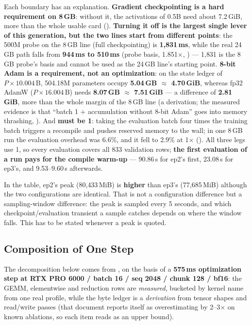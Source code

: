 Each boundary has an explanation. \textbf{Gradient checkpointing is a hard requirement on 8\,GB}:
without it, the activations of 0.5B need about 7.2\,GiB, more than the whole usable card
(). \textbf{Turning it off is the largest single lever of this generation,
but the two lines start from different points}: the 500M probe on the 8\,GB line (full
checkpointing) is \textbf{1{,}831\,ms}, while the real 24\,GB path falls from \textbf{944\,ms to
510\,ms} (probe basis, 1.851$\times$, ) --- 1{,}831 is the 8\,GB probe's
basis and cannot be used as the 24\,GB line's starting point. \textbf{8-bit Adam is a requirement,
not an optimization}: on the state ledger of $P\times10.004$\,B, 504.18M parameters occupy
\textbf{5.04\,GB $\approx$ 4.70\,GiB}, whereas fp32 AdamW ($P\times16.004$\,B) needs
\textbf{8.07\,GB $\approx$ 7.51\,GiB} --- a difference of \textbf{2.81\,GiB}, more than the whole
margin of the 8\,GB line (a derivation; the measured evidence is that ``batch 1 + accumulation
without 8-bit Adam'' goes into memory thrashing, ). And
\textbf{ must be 1}: taking the evaluation batch four times the training
batch triggers a recompile and pushes reserved memory to the wall; in one 8\,GB run the
evaluation overhead was 6.6\%, and it fell to 2.9\% at 1$\times$ (). All
three legs use 1, so every evaluation covers all 833 validation rows; \textbf{the first evaluation
of a run pays for the compile warm-up} --- 90.86\,s for ep2's first, 23.08\,s for ep3's, and
9.53--9.60\,s afterwards.

In the table, ep2's peak (80{,}433\,MiB) is \textbf{higher} than ep3's (77{,}685\,MiB) although the
two configurations are identical. That is not a configuration difference but a sampling-window
difference: the peak is sampled every 5 seconds, and which checkpoint/evaluation transient a
sample catches depends on where the window falls. This has to be stated whenever a peak is
quoted.

\subsection{Composition of One Step}

The decomposition below comes from , on the basis of a \textbf{575\,ms optimization
step at RTX PRO 6000 / batch 16 / seq 2048 / chunk 128 / bf16}: the GEMM, elementwise and
reduction rows are \emph{measured}, bucketed by kernel name from one real profile, while the byte
ledger is a \emph{derivation} from tensor shapes and read/write passes (that document reports
itself as overestimating by 2--3$\times$ on known ablations, so each item reads as an upper
bound).

